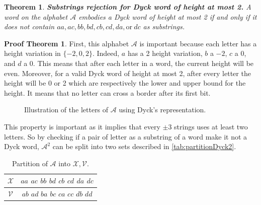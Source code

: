 \documentclass[11pt,a4paper]{article}
\theoremstyle{definition}
\theoremstyle{plain}
\newtheorem{theorem}{Theorem}[section]
\theoremstyle{definition}
\newtheorem{tproof}{Proof Theorem}[section]
\begin{document}
\begin{theorem}{\textbf{Substrings rejection for Dyck word of height at most 2.}}
    A word on the alphabet $\mathcal{A}$ embodies a Dyck word of
    height at most 2 if and only if it does not contain $aa, ac, bb, bd, cb, cd, da, \textrm{or}\ dc$
    as substrings.
\end{theorem}

\begin{tproof}
    First, this alphabet $\mathcal{A}$ is important because each letter has a height variation
    in $\{-2, 0, 2\}$. Indeed, $a$ has a 2 height variation, $b$ a $-2$, $c$ a 0, and $d$ a 0.
    This means that after each letter in a word, the current height will be even. Moreover,
    for a valid Dyck word of height at most 2, after every letter the height will be 0 or 2
    which are respectively the lower and upper bound for the height. It means that no letter
    can cross a border after its first bit.

    \begin{figure}[h!]
        \centering
        \caption{Illustration of the letters of $\mathcal{A}$ using Dyck's representation.}
        \label{tikz:dyck2alphabet}
    \end{figure}

    This property is important as it implies that every $\pm 3$ strings uses at least two letters.
    So by checking if a pair of letter as a substring of a word make it not a Dyck word, $\mathcal{A}^2$
    can be split into two sets described in \autoref{tab:partitionDyck2}.

    \begin{table}[htb]
        \centering
        \caption{Partition of $\mathcal{A}$ into $\mathcal{X}, \mathcal{V}$.}
        \label{tab:partitionDyck2}
        \begin{tabular}{|c|c|}
            \hline
            $\mathcal{X}$ & $aa$ $ac$ $bb$ $bd$ $cb$ $cd$ $da$ $dc$ \\
            \hline
            $\mathcal{V}$ & $ab$ $ad$ $ba$ $bc$ $ca$ $cc$ $db$ $dd$ \\
            \hline
        \end{tabular}



\end{table}
\end{tproof}
\end{document}
